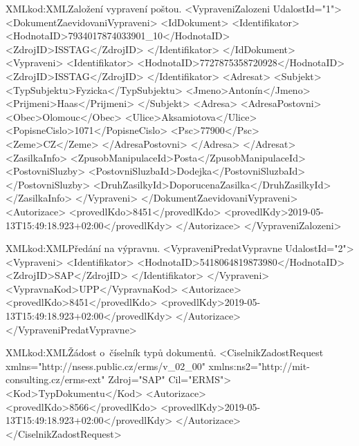 \documentclass[
  master,
  field=ainfp,
  biblatex,
  language=czech,
  glossaries,
  theorems=false,
  index
]{kidiplom}
\begin{document}
\begin{kicode}{XML}{kod:XML}{Založení vypravení poštou.}
<VypraveniZalozeni UdalostId="1">
    <DokumentZaevidovaniVypraveni>
        <IdDokument>
            <Identifikator>
                <HodnotaID>7934017874033901_10</HodnotaID>
                <ZdrojID>ISSTAG</ZdrojID>
            </Identifikator>
        </IdDokument>
        <Vypraveni>
            <Identifikator>
                <HodnotaID>7727875358720928</HodnotaID>
                <ZdrojID>ISSTAG</ZdrojID>
            </Identifikator>
            <Adresat>
                <Subjekt>
                    <TypSubjektu>Fyzicka</TypSubjektu>
                    <Jmeno>Antonín</Jmeno>
                    <Prijmeni>Haas</Prijmeni>
                </Subjekt>
                <Adresa>
                    <AdresaPostovni>
                        <Obec>Olomouc</Obec>
                        <Ulice>Aksamiotova</Ulice>
                        <PopisneCislo>1071</PopisneCislo>
                        <Psc>77900</Psc>
                        <Zeme>CZ</Zeme>
                    </AdresaPostovni>
                </Adresa>
            </Adresat>
            <ZasilkaInfo>
                <ZpusobManipulaceId>Posta</ZpusobManipulaceId>
                <PostovniSluzby>
                    <PostovniSluzbaId>Dodejka</PostovniSluzbaId>
                </PostovniSluzby>
                <DruhZasilkyId>DoporucenaZasilka</DruhZasilkyId>
            </ZasilkaInfo>
        </Vypraveni>
    </DokumentZaevidovaniVypraveni>
    <Autorizace>
        <provedlKdo>8451</provedlKdo>
        <provedlKdy>2019-05-13T15:49:18.923+02:00</provedlKdy>
    </Autorizace>
</VypraveniZalozeni>
\end{kicode}

\begin{kicode}{XML}{kod:XML}{Předání na výpravnu.}
<VypraveniPredatVypravne UdalostId="2">
    <Vypraveni>
        <Identifikator>
            <HodnotaID>5418064819873980</HodnotaID>
            <ZdrojID>SAP</ZdrojID>
        </Identifikator>
    </Vypraveni>
    <VypravnaKod>UPP</VypravnaKod>
    <Autorizace>
        <provedlKdo>8451</provedlKdo>
        <provedlKdy>2019-05-13T15:49:18.923+02:00</provedlKdy>
    </Autorizace>
</VypraveniPredatVypravne>
\end{kicode}

\begin{kicode}{XML}{kod:XML}{Žádost o~číselník typů dokumentů.}
<CiselnikZadostRequest xmlns="http://nsess.public.cz/erms/v_02_00" 
    xmlns:ns2="http://mit-consulting.cz/erms-ext" Zdroj="SAP" Cil="ERMS">
    <Kod>TypDokumentu</Kod>
    <Autorizace>
        <provedlKdo>8566</provedlKdo>
        <provedlKdy>2019-05-13T15:49:18.923+02:00</provedlKdy>
    </Autorizace>
</CiselnikZadostRequest>
\end{kicode}
\end{document}
